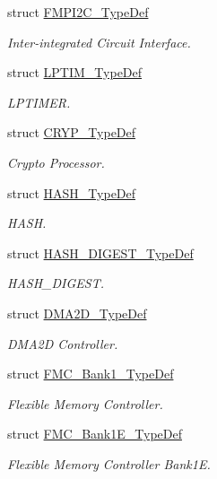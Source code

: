 \begin{DoxyCompactItemize}
struct \hyperlink{struct_f_m_p_i2_c___type_def}{F\+M\+P\+I2\+C\+\_\+\+Type\+Def}
\begin{DoxyCompactList}\small\item\em Inter-\/integrated Circuit Interface. \end{DoxyCompactList}\item 
struct \hyperlink{struct_l_p_t_i_m___type_def}{L\+P\+T\+I\+M\+\_\+\+Type\+Def}
\begin{DoxyCompactList}\small\item\em L\+P\+T\+I\+M\+ER. \end{DoxyCompactList}\item 
struct \hyperlink{struct_c_r_y_p___type_def}{C\+R\+Y\+P\+\_\+\+Type\+Def}
\begin{DoxyCompactList}\small\item\em Crypto Processor. \end{DoxyCompactList}\item 
struct \hyperlink{struct_h_a_s_h___type_def}{H\+A\+S\+H\+\_\+\+Type\+Def}
\begin{DoxyCompactList}\small\item\em H\+A\+SH. \end{DoxyCompactList}\item 
struct \hyperlink{struct_h_a_s_h___d_i_g_e_s_t___type_def}{H\+A\+S\+H\+\_\+\+D\+I\+G\+E\+S\+T\+\_\+\+Type\+Def}
\begin{DoxyCompactList}\small\item\em H\+A\+S\+H\+\_\+\+D\+I\+G\+E\+ST. \end{DoxyCompactList}\item 
struct \hyperlink{struct_d_m_a2_d___type_def}{D\+M\+A2\+D\+\_\+\+Type\+Def}
\begin{DoxyCompactList}\small\item\em D\+M\+A2D Controller. \end{DoxyCompactList}\item 
struct \hyperlink{struct_f_m_c___bank1___type_def}{F\+M\+C\+\_\+\+Bank1\+\_\+\+Type\+Def}
\begin{DoxyCompactList}\small\item\em Flexible Memory Controller. \end{DoxyCompactList}\item 
struct \hyperlink{struct_f_m_c___bank1_e___type_def}{F\+M\+C\+\_\+\+Bank1\+E\+\_\+\+Type\+Def}
\begin{DoxyCompactList}\small\item\em Flexible Memory Controller Bank1E. \end{DoxyCompactList}\item 

\end{DoxyCompactItemize}
